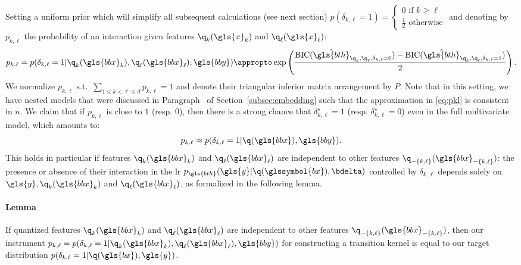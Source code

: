 Setting a uniform prior which will simplify all subsequent calculations (see next section) $p(\delta_{k,\ell}=1) =\begin{cases} 0 \text{ if } k \geq \ell \\ \frac{1}{2} \text{ otherwise} \end{cases}$ and denoting by $p_{k,\ell}$ the probability of an interaction given features $\q_k(\gls{x}_k)$ and $\q_\ell(\gls{x}_\ell)$:
\begin{equation} \label{eq:pkl}
p_{k,\ell} = p(\delta_{k,\ell} = 1 | \q_k(\gls{bbx}_k), \q_\ell(\gls{bbx}_\ell), \gls{bby}) \appropto \exp \left( \frac{\text{BIC}(\hat{\gls{bth}}_{\q_k,\q_\ell,\delta_{k,\ell}=0}) - \text{BIC}(\hat{\gls{bth}}_{\q_k,\q_\ell,\delta_{k,\ell}=1})}{2} \right).
\end{equation}
We normalize $p_{k,\ell}$ s.t.\ $\sum_{1 \leq k < \ell \leq d} p_{k,\ell} = 1$ and denote their triangular inferior matrix arrangement by $P$. Note that in this setting, we have nested models that were discussed in Paragraph~ of Section~\ref{subsec:embedding} such that the approximation in \eqref{eq:pkl} is consistent in $n$.
We claim that if $p_{k,\ell}$ is close to $1$ (resp. $0$), then there is a strong chance that $\delta_{k,\ell}^\star = 1$ (resp. $\delta_{k,\ell}^\star = 0$) even in the full multivariate model, which amounts to:
\[ p_{k,\ell} \approx p(\delta_{k,\ell} = 1 | \q(\gls{bbx}),\gls{bby}) .\]
This holds in particular if features $\q_k(\gls{bbx}_k)$ and $\q_\ell(\gls{bbx}_\ell)$ are independent to other features $\q_{-\{k,\ell\}}(\gls{bbx}_{-\{k,\ell\}})$: the presence or absence of their interaction in the \gls{lr} $p_{\gls{bth}}(\gls{y} | \q(\glssymbol{bx}), \bdelta)$ controlled by $\delta_{k,\ell}$ depends solely on $\gls{y}, \q_k(\gls{bbx}_k)$ and $\q_\ell(\gls{bbx}_\ell)$, as formalized in the following lemma.

\paragraph{Lemma} If quantized features $\q_k(\gls{bbx}_k)$ and $\q_\ell(\gls{bbx}_\ell)$ are independent to other features $\q_{-\{k,\ell\}}(\gls{bbx}_{-\{k,\ell\}})$, then our instrument $p_{k,\ell} = p(\delta_{k,\ell} = 1 | \q_k(\gls{bbx}_k), \q_\ell(\gls{bbx}_\ell), \gls{bby})$ for constructing a transition kernel is equal to our target distribution $p(\delta_{k,\ell} = 1 | \q(\gls{bx}),\gls{y})$.

